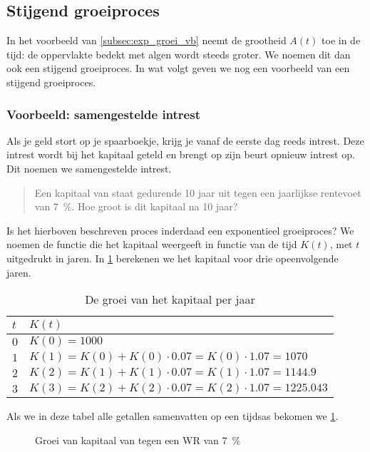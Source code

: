 \subsection{Stijgend groeiproces}\label{subsec:stijgendGroeiproces}
In het voorbeeld van \cref{subsec:exp_groei_vb} neemt de grootheid $A(t)$ toe in de tijd: de
oppervlakte bedekt met algen wordt steeds groter. We noemen dit dan
ook een stijgend groeiproces. In wat volgt geven we nog een voorbeeld van een stijgend
groeiproces. 

\subsubsection{Voorbeeld: samengestelde intrest}\label{subsubsec.si}
Als je geld stort op je spaarboekje, krijg je vanaf de eerste dag reeds intrest. Deze intrest wordt bij het kapitaal geteld en brengt op zijn beurt opnieuw intrest op. Dit noemen we samengestelde intrest.
\begin{quote}
    Een kapitaal van  staat gedurende 10 jaar uit tegen een
jaarlijkse rentevoet van \SI{7}{\percent}. Hoe groot is dit kapitaal na 10
jaar?
\end{quote}
Is het hierboven beschreven proces inderdaad een exponentieel groeiproces? 
We noemen de functie die het kapitaal
weergeeft in functie van de tijd $K(t)$, met $t$ uitgedrukt in jaren.
In \cref{tbl:groeikap} berekenen we het kapitaal voor drie opeenvolgende jaren.
\begin{table}[tbp]
    \centering
    \caption{De groei van het kapitaal per jaar}
    \begin{tabular}{ll}
    \toprule
    $t$ & $K(t)$\\
    \midrule
    $0$ 	& $K(0)=1000$ 	\\
    $1$	&$K(1)=K(0)+K(0)\cdot \num{0.07}=  K(0)\cdot \num{1.07}=1070$\\
   $2$	&$K(2)=K(1)+K(1)\cdot \num{0.07}= K(1)\cdot \num{1.07}=\num{1144.9}$ \\
   $3$	&$K(3)=K(2)+K(2)\cdot \num{0.07}= K(2)\cdot \num{1.07}=\num{1225.043}$ \\
\bottomrule
\end{tabular}
\label{tbl:groeikap}
\end{table}
Als we in deze tabel alle getallen samenvatten op een tijdsas bekomen we \cref{fig:kapitaalgroei}.
\begin{figure}[htbp]
    \centering
{}
    \caption{Groei van kapitaal van  tegen een WR van \SI{7}{\percent}}
    \label{fig:kapitaalgroei} 
\end{figure}



